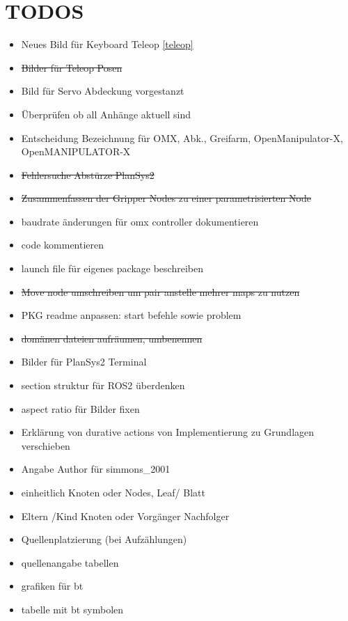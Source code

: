 \section{TODOS}
\begin{itemize}
    \item Neues Bild für Keyboard Teleop \ref{teleop}
    \item \sout{Bilder für Teleop Posen}
    \item Bild für Servo Abdeckung vorgestanzt
    \item Überprüfen ob all Anhänge aktuell sind
    \item Entscheidung Bezeichnung für OMX, Abk., Greifarm, OpenManipulator-X, OpenMANIPULATOR-X
    \item \sout{Fehlersuche Abstürze PlanSys2}
    \item \sout{Zusammenfassen der Gripper Nodes zu einer parametrisierten Node}
    \item baudrate änderungen für omx controller dokumentieren
    \item code kommentieren
    \item launch file für eigenes package beschreiben
    \item \sout{Move node umschreiben um pair anstelle mehrer maps zu nutzen}
    \item PKG readme anpassen: start befehle sowie problem
    \item \sout{domänen dateien aufräumen, umbenennen}
    \item Bilder für PlanSys2 Terminal
    \item section struktur für ROS2 überdenken
    \item aspect ratio für Bilder fixen
    \item Erklärung von durative actions von Implementierung zu Grundlagen verschieben
    \item Angabe Author für simmons\_2001
    \item einheitlich Knoten oder Nodes, Leaf/ Blatt
    \item Eltern /Kind Knoten oder Vorgänger Nachfolger
    \item Quellenplatzierung (bei Aufzählungen)
    \item quellenangabe tabellen
    \item grafiken für bt
    \item tabelle mit bt symbolen
\end{itemize}